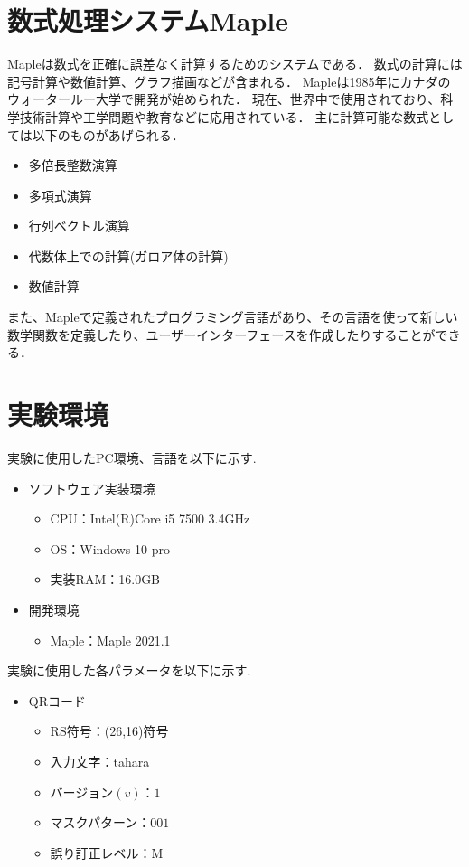 \documentclass{thesis}
\begin{document}
\section{数式処理システムMaple\cite{Maple}}
Mapleは数式を正確に誤差なく計算するためのシステムである．
数式の計算には記号計算や数値計算、グラフ描画などが含まれる．
Mapleは1985年にカナダのウォータールー大学で開発が始められた．
現在、世界中で使用されており、科学技術計算や工学問題や教育などに応用されている．
主に計算可能な数式としては以下のものがあげられる．
\begin{itemize}
\item 多倍長整数演算
\item 多項式演算
\item 行列ベクトル演算
\item 代数体上での計算(ガロア体の計算)
\item 数値計算
\end{itemize}

また、Mapleで定義されたプログラミング言語があり、その言語を使って新しい数学関数を定義したり、ユーザーインターフェースを作成したりすることができる．

\section{実験環境}

実験に使用したPC環境、言語を以下に示す.

\begin{itemize}
\setlength{\itemsep}{5mm}
 \item ソフトウェア実装環境
    \begin{itemize}
      \item CPU：Intel(R)Core i5 7500 3.4GHz
      \item OS：Windows 10 pro
      \item 実装RAM：16.0GB
     \end{itemize}
   \item 開発環境
    \begin{itemize}
      \item Maple：Maple 2021.1
   \end{itemize}
\end{itemize}

実験に使用した各パラメータを以下に示す.

\begin{itemize}
\setlength{\itemsep}{5mm}
 \item QRコード
    \begin{itemize}
      \item RS符号：(26,16)符号
      \item 入力文字：tahara
      \item バージョン$(v)$：$1$
      \item マスクパターン：$001$
      \item 誤り訂正レベル：M
      
     \end{itemize}
  \end{itemize}
\end{document}
